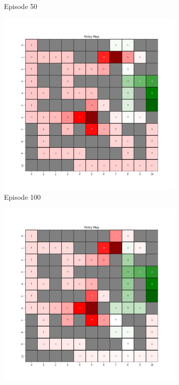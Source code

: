 \documentclass{assignment}
\begin{document}
\begin{figure}[H]
\begin{subfigure}{0.3\textwidth}
    \caption{Episode 50}
    \end{subfigure}\hfill
    \begin{subfigure}{0.3\textwidth}
        \includegraphics[width=\textwidth]{figures/policy_td/epsilon_sweep/policy_alpha_0.1_gamma_0.95_epsilon_0.5_iteration_100.png}
    \caption{Episode 100}
    \end{subfigure}
    \begin{subfigure}{0.3\textwidth}
        \includegraphics[width=\textwidth]{figures/policy_td/epsilon_sweep/policy_alpha_0.1_gamma_0.95_epsilon_0.5_iteration_1000.png}

\end{subfigure}
\end{figure}
\end{document}
